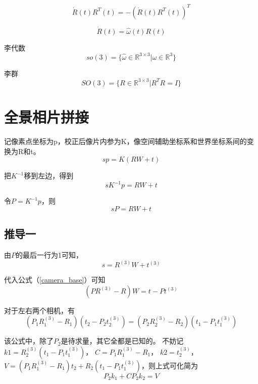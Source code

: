 \documentclass{ctexart}
\begin{document}
	\begin{equation}
	\dot{R}(t) R^T(t) = -(\dot{R}(t) R^T(t))^T
	\end{equation}
	
	\begin{equation}
	\dot{R}(t) = \hat{\omega}(t) R(t)
	\end{equation}
	
	李代数
	\begin{equation}
	so(3) = \{ \hat{\omega} \in \mathbb{R}^{3\times 3} | \omega \in \mathbb{R}^3 \}
	\end{equation}
	
	李群
	\begin{equation}
	SO(3) = \{ R \in \mathbb{R}^{3\times 3} | R^T R = I \}
	\end{equation}
	
	
	\section{全景相片拼接}
	记像素点坐标为p，校正后像片内参为K，像空间辅助坐标系和世界坐标系间的变换为R和t。
	\begin{equation}
	sp=K(RW+t)
	\end{equation}
	
	把$K^{-1}$移到左边，得到
	\begin{equation}
	sK^{-1}p=RW+t
	\end{equation}
	
	令$P=K^{-1}p$，则
	\begin{equation}
	sP=RW+t \label{camera_base}
	\end{equation}
	
	\subsection{推导一}
	由$P$的最后一行为1可知，
	\begin{equation}
	s=R^{(3)}W+t^{(3)}
	\end{equation}
	
	代入公式（\ref{camera_base}）可知
	\begin{equation}
	(PR^{(3)}-R)W=t-Pt^{(3)} \label{wrong_label}
	\end{equation}
	
	对于左右两个相机，有
	\begin{equation}
	(P_1 R_1^{(3)} - R_1)(t_2 - P_2 t_2^{(3)})=
	(P_2 R_2^{(3)} - R_2)(t_1 - P_1 t_1^{(3)})
	\end{equation}
	
	该公式中，除了$P_2$是待求量，其它全都是已知的。
	不妨记$k1=R_2^{(3)} (t_1 - P_1 t_1^{(3)})$，
	$C=P_1 R_1^{(3)} - R_1$，
	$k2=t_2^{(3)}$，
	$V=(P_1 R_1^{(3)} - R_1)t_2 + R_2(t_1 - P_1 t_1^{(3)})$，则上式可化简为
	\begin{equation}
	P_2 k_1 + C P_2 k_2 = V
	\end{equation}
	
\end{document}
